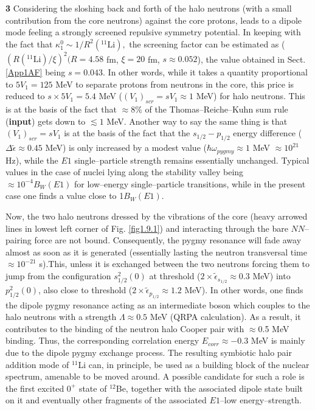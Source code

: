 \textbf{3} Considering the sloshing back and forth of the halo neutrons (with a small contribution from the core neutrons) against the core protons, leads to a dipole mode feeling a strongly screened repulsive symmetry potential. In keeping with the fact that $\kappa_1^0\sim1/R^2(^{11}\text{Li}),$ the screening factor can be estimated as ($(R(^{11}\text{Li})/\xi)^2(R=4.58$  fm, $\xi=20$ fm, $s\approx0.052$), the value obtained in Sect. \ref{App1AF} being $s=0.043$. In other words, while it takes  a quantity proportional to $5V_1=125$ MeV to separate protons from neutrons in the core, this price is reduced to $s\times 5 V_1=5.4$ MeV ($(V_1)_{scr}=sV_1\approx1$ MeV) for halo neutrons. This is at the basis of the fact that $\approx 8\%$ of the Thomas--Reiche--Kuhn sum rule (\textbf{input}) gets down to $\lesssim 1$ MeV. Another way to say the same thing is that $(V_1)_{scr}=sV_1$ is at the basis of the fact that the $s_{1/2}- p_{1/2}$ energy difference ($\Delta \tilde\epsilon\approx 0.45$ MeV) is only increased by a modest value ($\hbar \omega_{pygmy}\approx 1$ MeV $\approx 10^{21}$ Hz), while the $E1$  single--particle strength remains essentially unchanged. Typical values in the case of nuclei lying along the stability valley being $\approx 10^{-4} B_{W} (E1)$ for  low--energy  single--particle transitions, while in the present case one finds a value close to 1$B_{W}(E1)$. 


Now, the two halo neutrons dressed by the vibrations of the core (heavy arrowed lines in lowest left corner of Fig. \ref{fig1.9.1}) and interacting through the bare $NN$--pairing force are not bound. Consequently, the pygmy resonance will fade away almost as soon as it is generated (essentially lasting the neutron transversal time $\approx 10^{-21}$ s).This, unless it is exchanged between the two neutrons forcing them to jump from the configuration $s^{2}_{1/2}(0)$ at threshold ($2\times\tilde\epsilon_{s_{1/2}}\approx 0.3$ MeV) into  $p^2_{1/2}(0)$, also close to threshold     ($2\times\tilde\epsilon_{p_{1/2}}\approx 1.2$ MeV). In other words, one finds the dipole pygmy resonance acting as an intermediate boson which  couples to the halo neutrons with a  strength $\Lambda\approx 0.5$ MeV (QRPA calculation). As a result, it contributes to the binding of the neutron halo Cooper pair with $\approx$0.5 MeV binding. Thus, the corresponding correlation energy $E_{corr}\approx-0.3$ MeV is mainly due to the dipole pygmy exchange process. The resulting symbiotic halo pair addition mode of $^{11}$Li can, in principle, be used as a building block of the nuclear spectrum, amenable to  be moved around. A possible candidate for such a role is the first excited $0^+$ state of $^{12}$Be, together with the associated dipole state built on it and eventually other fragments of the associated $E1$--low energy--strength.


